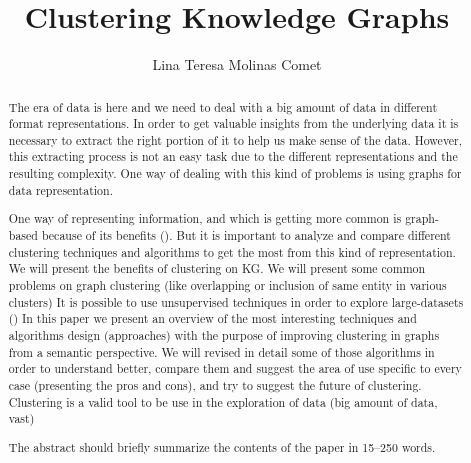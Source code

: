 \documentclass[runningheads]{llncs}
\begin{document}
%
\title{Clustering Knowledge Graphs}
%
%
\author{Lina Teresa Molinas Comet}
%
%
%
\maketitle              %
%
\begin{abstract}
The era of data is here and we need to deal with a big amount of data in different format representations. In order to get valuable insights from the underlying data it is necessary to extract the right portion of it to help us make sense of the data. However, this extracting process is not an easy task due to the different representations and the resulting complexity. One way of dealing with this kind of problems is using graphs for data representation.

One way of representing information, and which is getting more common is graph-based because of its benefits (). But it is important to analyze and compare different clustering techniques and algorithms to get the most from this kind of representation. We will present the benefits of clustering on KG. We will present some common problems on graph clustering (like overlapping or inclusion of same entity in various clusters)
It is possible to use unsupervised techniques in order to explore large-datasets ()
In this paper we present an overview of the most interesting techniques and algorithms design (approaches) with the purpose of improving clustering in graphs from a semantic perspective. We will revised in detail some of those algorithms in order to understand better, compare them and suggest the area of use specific to every case (presenting the pros and cons), and try to suggest the future of clustering.
Clustering is a valid tool to be use in the exploration of data (big amount of data, vast)

The abstract should briefly summarize the contents of the paper in
15--250 words.

\end{abstract}
%
%
%
\end{document}
